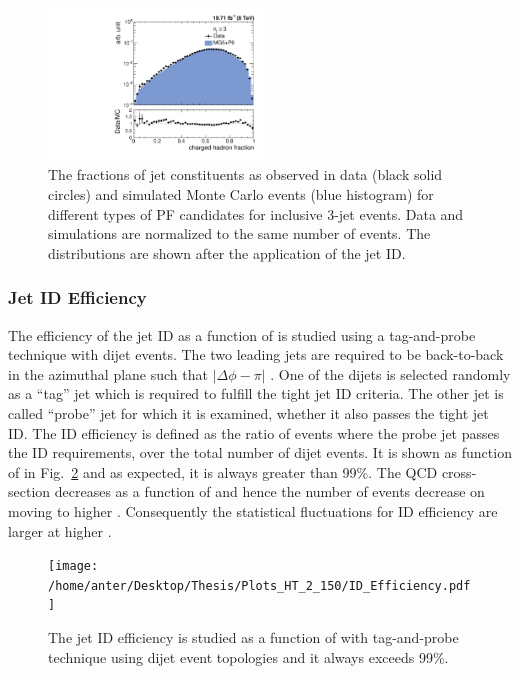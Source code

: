 \begin{figure}[!htbp]
\begin{center}
 \vspace*{1mm}
 \includegraphics[width=0.51\textwidth]{Plots_HT_2_150/Comparison_ChHadFrac_3_HT_2_150.pdf}
 \caption{The fractions of jet constituents as observed in data (black solid circles) and simulated Monte Carlo events (blue histogram) for different types of PF candidates for inclusive 3-jet events. Data and simulations are normalized to the same number of events. The distributions are shown after the application of the jet ID.}
 \label{fig:qual3}
 \end{center}
\end{figure} 

\subsubsection{Jet ID Efficiency}
The efficiency of the jet ID as a function of \httwo is studied using a tag-and-probe technique with dijet events. The two leading jets are required to be back-to-back in the azimuthal plane such that $|\Delta\phi - \pi|$ . One of the dijets is selected randomly as a ``tag'' jet which is required to fulfill the tight jet ID criteria. The other jet is called ``probe'' jet for which it is examined, whether it also passes the tight jet ID. The ID efficiency is defined as the ratio of events where the probe jet passes the ID requirements, over the total number of dijet events. It is shown as function of \httwo in Fig.~\ref{fig:ideff} and as expected, it is always greater than 99\%. The QCD cross-section decreases as a function of \httwo and hence the number of events decrease on moving to higher \httwons. Consequently the statistical fluctuations for ID efficiency are larger at higher \httwons.

\begin{figure}[!htbp]
 \begin{center}
 \texttt{[image: /home/anter/Desktop/Thesis/Plots\_HT\_2\_150/ID\_Efficiency.pdf]}
 \caption{The jet ID efficiency is studied as a function of \httwo with tag-and-probe technique using dijet event topologies and it always exceeds 99\%.}
 \label{fig:ideff}
 \end{center}
\end{figure} 

